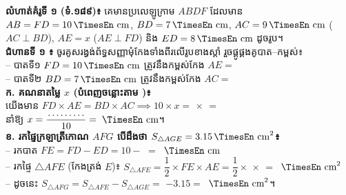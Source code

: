 \documentclass[a4paper,10pt]{article}
\newcommand{\en}[1]{{\TimesEn #1}}
\newcommand{\unit}[1]{\,\text{\en{#1}}}
\newcommand{\cnum}[1]{\mbox{\fontsize{10pt}{12pt}\selectfont\ding{\numexpr181+#1\relax}}}
\newcommand{\blank}[1]{\makebox[#1]{\dotfill}}
\newcommand{\tri}[1]{\ensuremath{\triangle #1}}
\begin{document}
\begin{tcolorbox}[
  enhanced, sharp corners, colback=white, colframe=black,
  boxrule=0.95pt, boxsep=2pt, top=4pt, bottom=4pt, left=6pt, right=6pt, after skip=5pt
]
  \begin{minipage}[c]{11.8cm}
    \textbf{លំហាត់គំរូទី ១ (ទំ.១៨៩)៖} គេមានប្រលេឡូក្រាម $ABDF$ ដែលមាន $AB = FD = 10\unit{cm}$, $BD = 7\unit{cm}$, $AC = 9\unit{cm}$ ($AC \perp BD$), $AE = x$ ($AE \perp FD$) និង $ED = 8\unit{cm}$ ដូចរូប។\\[2pt]
    \textbf{ជំហានទី ១ \en{[Tracing]}៖} ចូរគូសរង្វង់ព័ទ្ធសញ្ញាមុំកែងទាំងពីរលើរូបខាងស្ដាំ រួចផ្គូផ្គងគូបាត--កម្ពស់៖\\
    \hspace*{0.4cm}-- បាតទី១ $FD = 10\unit{cm}$ ត្រូវនឹងកម្ពស់កែង $AE =$ \blank{1.6cm}\\
    \hspace*{0.4cm}-- បាតទី២ $BD = 7\unit{cm}$ ត្រូវនឹងកម្ពស់កែង $AC =$ \blank{1.6cm}\\[2pt]
    \textbf{ក. គណនាតម្លៃ $x$ (បំពេញចន្លោះតាម \cnum{3})៖}\\
    \hspace*{0.4cm}យើងមាន $FD \times AE = BD \times AC \implies 10 \times x =$ \blank{1.3cm} $\times$ \blank{1.3cm} $=$ \blank{1.5cm}\\
    \hspace*{0.4cm}នាំឱ្យ $x = \dfrac{\blank{1.4cm}}{10} =$ \blank{1.8cm} $\unit{cm}$។\\[2pt]
    \textbf{ខ. រកផ្ទៃក្រឡាត្រីកោណ $AFG$ បើដឹងថា $S_{\tri{AGE}} = 3.15\unit{cm}^2$៖}\\
    \hspace*{0.4cm}-- រកបាត $FE = FD - ED = 10 -$ \blank{1.2cm} $=$ \blank{1.3cm} $\unit{cm}$\\
    \hspace*{0.4cm}-- រកផ្ទៃ $\tri{AFE}$ (កែងត្រង់ $E$)៖ $S_{\tri{AFE}} = \dfrac{1}{2} \times FE \times AE = \dfrac{1}{2} \times$ \blank{1.2cm} $\times$ \blank{1.5cm} $=$ \blank{1.6cm} $\unit{cm}^2$\\
    \hspace*{0.4cm}-- ដូចនេះ $S_{\tri{AFG}} = S_{\tri{AFE}} - S_{\tri{AGE}} =$ \blank{1.5cm} $- 3.15 =$ \blank{1.8cm} $\unit{cm}^2$។
  \end{minipage}\hfill
  \begin{minipage}[c]{6.4cm}
    \centering
\end{minipage}
\end{tcolorbox}
\end{document}
